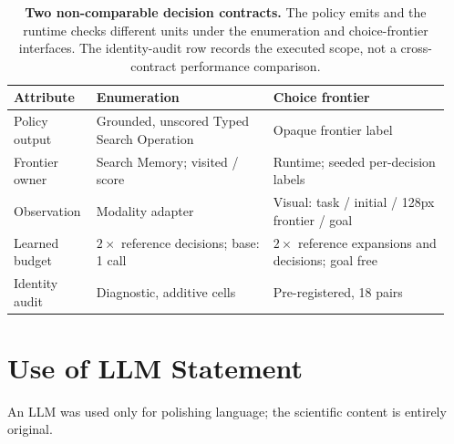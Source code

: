 \begin{table}[t]
\caption{\textbf{Two non-comparable decision contracts.} The policy emits and the runtime checks different units under the enumeration and choice-frontier interfaces. The identity-audit row records the executed scope, not a cross-contract performance comparison.}
\label{tab:design-contracts}
\centering\footnotesize
\setlength{\tabcolsep}{3pt}
\begin{tabular}{@{}p{0.17\linewidth}p{0.39\linewidth}p{0.39\linewidth}@{}}
\toprule[0.4mm]
\rowcolor{mygray}\textbf{Attribute} & \textbf{Enumeration} & \textbf{Choice frontier} \\
\midrule
Policy output & Grounded, unscored Typed Search Operation & Opaque frontier label \\
Frontier owner & Search Memory; visited / score & Runtime; seeded per-decision labels \\
Observation & Modality adapter & Visual: task / initial / 128px frontier / goal \\
Learned budget & $2\times$ reference decisions; base: 1 call & $2\times$ reference expansions and decisions; goal free \\
Identity audit & Diagnostic, additive cells & Pre-registered, 18 pairs \\
\bottomrule
\end{tabular}
\end{table}

\section{Use of LLM Statement}
\label{app:llm-usage}

An LLM was used only for polishing language; the scientific content is entirely original.



